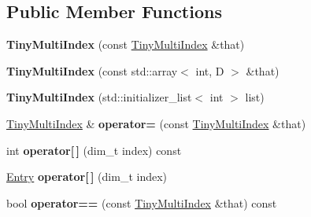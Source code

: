 \subsection*{Public Member Functions}
\begin{DoxyCompactItemize}
\item 
\hypertarget{classwaveblocks_1_1_tiny_multi_index_a47b8afba6305c1388b2f039f7a43a49c}{}{\bfseries Tiny\+Multi\+Index} (const \hyperlink{classwaveblocks_1_1_tiny_multi_index}{Tiny\+Multi\+Index} \&that)\label{classwaveblocks_1_1_tiny_multi_index_a47b8afba6305c1388b2f039f7a43a49c}

\item 
\hypertarget{classwaveblocks_1_1_tiny_multi_index_ab093916494f04e7ba357fb86d20840a4}{}{\bfseries Tiny\+Multi\+Index} (const std\+::array$<$ int, D $>$ \&that)\label{classwaveblocks_1_1_tiny_multi_index_ab093916494f04e7ba357fb86d20840a4}

\item 
\hypertarget{classwaveblocks_1_1_tiny_multi_index_aa3d34c6fa93aa38a265b38346870a992}{}{\bfseries Tiny\+Multi\+Index} (std\+::initializer\+\_\+list$<$ int $>$ list)\label{classwaveblocks_1_1_tiny_multi_index_aa3d34c6fa93aa38a265b38346870a992}

\item 
\hypertarget{classwaveblocks_1_1_tiny_multi_index_a45fbaaaf717bf7a794b7e0359c515ba1}{}\hyperlink{classwaveblocks_1_1_tiny_multi_index}{Tiny\+Multi\+Index} \& {\bfseries operator=} (const \hyperlink{classwaveblocks_1_1_tiny_multi_index}{Tiny\+Multi\+Index} \&that)\label{classwaveblocks_1_1_tiny_multi_index_a45fbaaaf717bf7a794b7e0359c515ba1}

\item 
\hypertarget{classwaveblocks_1_1_tiny_multi_index_ad99a267f33ca959d17e31627999d94b0}{}int {\bfseries operator\mbox{[}$\,$\mbox{]}} (dim\+\_\+t index) const \label{classwaveblocks_1_1_tiny_multi_index_ad99a267f33ca959d17e31627999d94b0}

\item 
\hypertarget{classwaveblocks_1_1_tiny_multi_index_a62abf703eb41b6d0b096450560c7211e}{}\hyperlink{classwaveblocks_1_1_tiny_multi_index_1_1_entry}{Entry} {\bfseries operator\mbox{[}$\,$\mbox{]}} (dim\+\_\+t index)\label{classwaveblocks_1_1_tiny_multi_index_a62abf703eb41b6d0b096450560c7211e}

\item 
\hypertarget{classwaveblocks_1_1_tiny_multi_index_a197f080f8f549d247ef3c659305db7b6}{}bool {\bfseries operator==} (const \hyperlink{classwaveblocks_1_1_tiny_multi_index}{Tiny\+Multi\+Index} \&that) const \label{classwaveblocks_1_1_tiny_multi_index_a197f080f8f549d247ef3c659305db7b6}


\end{DoxyCompactItemize}
